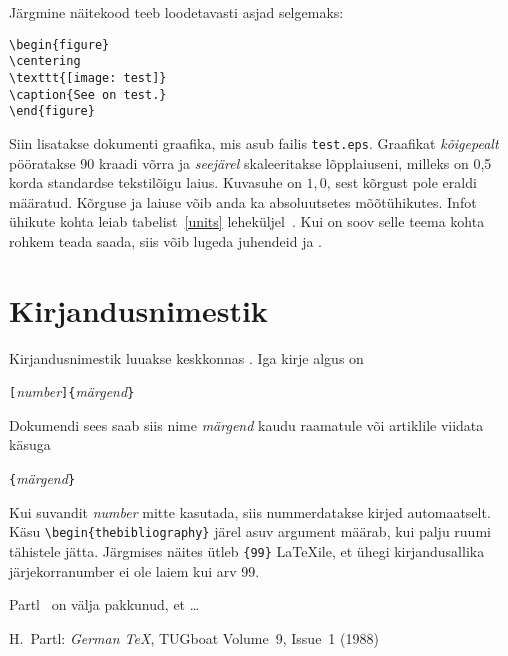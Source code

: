 Järgmine näitekood teeb loodetavasti asjad selgemaks:
\begin{code}
\begin{verbatim}
\begin{figure}
\centering
\texttt{[image: test]}
\caption{See on test.}
\end{figure}
\end{verbatim}
\end{code}
Siin lisatakse dokumenti graafika, mis asub failis \texttt{test.eps}.
Graafikat \emph{kõigepealt} pööratakse 90 kraadi võrra ja
\emph{seejärel} skaleeritakse lõpplaiuseni, milleks on 0{,}5 korda
standardse tekstilõigu laius. Kuvasuhe on $1{,}0$, sest kõrgust pole
eraldi määratud. Kõrguse ja laiuse võib anda ka absoluutsetes
mõõtühikutes. Infot ühikute kohta leiab tabelist~\ref{units}
leheküljel~\pageref{units}. Kui on soov selle teema kohta rohkem teada
saada, siis võib lugeda juhendeid \cite{graphics} ja \cite{eps}.

\section{Kirjandusnimestik}

Kirjandusnimestik luuakse keskkonnas
. Iga kirje algus on
\begin{lscommand}
\verb|[|\emph{number}\verb|]{|\emph{märgend}\verb|}|
\end{lscommand}
\noindent Dokumendi sees saab siis nime \emph{märgend} kaudu raamatule
või artiklile viidata käsuga
\begin{lscommand}
\verb|{|\emph{märgend}\verb|}|
\end{lscommand}
Kui suvandit \emph{number} mitte kasutada, siis nummerdatakse kirjed
automaatselt. Käsu \verb|\begin{thebibliography}| järel asuv argument
määrab, kui palju ruumi tähistele jätta. Järgmises näites ütleb
\verb|{99}| \LaTeX ile, et ühegi kirjandusallika järjekorranumber ei ole
laiem kui arv 99.
\begin{example}
Partl~\cite{pa} on
välja pakkunud, et \ldots
\begin{thebibliography}{99}
 H.~Partl:
\emph{German \TeX},
TUGboat Volume~9, Issue~1 (1988)
\end{thebibliography}
\end{example}

\thispagestyle{fancyplain}

